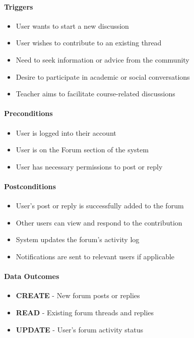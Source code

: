 \paragraph{Triggers}
\begin{itemize}
    \item User wants to start a new discussion
    \item User wishes to contribute to an existing thread
    \item Need to seek information or advice from the community
    \item Desire to participate in academic or social conversations
    \item Teacher aims to facilitate course-related discussions
\end{itemize}

\paragraph{Preconditions}
\begin{itemize}
    \item User is logged into their account
    \item User is on the Forum section of the system
    \item User has necessary permissions to post or reply
\end{itemize}

\paragraph{Postconditions}
\begin{itemize}
    \item User's post or reply is successfully added to the forum
    \item Other users can view and respond to the contribution
    \item System updates the forum's activity log
    \item Notifications are sent to relevant users if applicable
\end{itemize}

\paragraph{Data Outcomes}
\begin{itemize}
    \item \textbf{CREATE} - New forum posts or replies
    \item \textbf{READ} - Existing forum threads and replies
    \item \textbf{UPDATE} - User's forum activity status
\end{itemize} 

